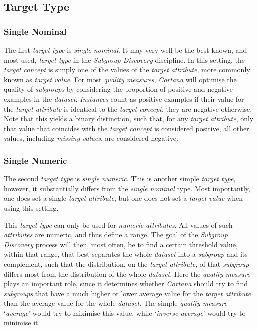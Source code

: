 \documentclass{article}
\begin{document}
\subsection{Target Type}
\label{preliminaries:target-type}

\subsubsection{Single Nominal}
The first \emph{target type} is \emph{single nominal}.
It may very well be the best known, and most used, \emph{target type} in the \emph{Subgroup Discovery} discipline.
In this setting, the \emph{target concept} is simply one of the values of the \emph{target attribute}, more commonly known as \emph{target value}.
For most \emph{quality measures}, \emph{Cortana} will optimise the quality of \emph{subgroups} by considering the proportion of positive and negative examples in the \emph{dataset}.
\emph{Instances} count as positive examples if their value for the \emph{target attribute} is identical to the \emph{target concept}, they are negative otherwise.
Note that this yields a binary distinction, such that, for any \emph{target attribute}, only that value that coincides with the \emph{target concept} is considered positive, all other values, including \emph{missing values}, are considered negative.

\subsubsection{Single Numeric}
The second \emph{target type} is \emph{single numeric}.
This is another simple \emph{target type}, however, it substantially differs from the \emph{single nominal} type.
Most importantly, one does set a single \emph{target attribute}, but one does not set a \emph{target value} when using this setting.

This \emph{target type} can only be used for \emph{numeric} \emph{attributes}.
All values of such \emph{attributes} are numeric, and thus define a range.
The goal of the \emph{Subgroup Discovery} process will then, most often, be to find a certain threshold value, within that range, that best separates the whole \emph{dataset} into a \emph{subgroup} and its complement, such that the distribution, on the \emph{target attribute}, of that \emph{subgroup} differs most from the distribution of the whole \emph{dataset}.
Here the \emph{quality measure} plays an important role, since it determines whether \emph{Cortana} should try to find \emph{subgroups} that have a much higher or lower average value for the \emph{target attribute} than the average value for the whole \emph{dataset}.
The simple \emph{quality measure} `\emph{average}'  would try to miximise this value, while `\emph{inverse average}' would try to minimise it.
\end{document}
